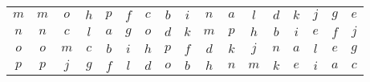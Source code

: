 \documentclass[12pt]{amsart}
\begin{document}
\begin{center}
\begin{tabular}{c|cccccccccccccccc}
	\(m\)  & \(m\)  & \(o\)  & \(h\)  & \(p\)  & \(f\)  & \(c\)  & \(b\)  & \(i\)  & \(n\)  & \(a\)  & \(l\)  & \(d\)  & \(k\)  & \(j\)  & \(g\)  & \(e\)  \\
	\(n\)  & \(n\)  & \(c\)  & \(l\)  & \(a\)  & \(g\)  & \(o\)  & \(d\)  & \(k\)  & \(m\)  & \(p\)  & \(h\)  & \(b\)  & \(i\)  & \(e\)  & \(f\)  & \(j\)  \\
	\(o\)  & \(o\)  & \(m\)  & \(c\)  & \(b\)  & \(i\)  & \(h\)  & \(p\)  & \(f\)  & \(d\)  & \(k\)  & \(j\)  & \(n\)  & \(a\)  & \(l\)  & \(e\)  & \(g\)  \\
	\(p\)  & \(p\)  & \(j\)  & \(g\)  & \(f\)  & \(l\)  & \(d\)  & \(o\)  & \(b\)  & \(h\)  & \(n\)  & \(m\)  & \(k\)  & \(e\)  & \(i\)  & \(a\)  & \(c\)  
\end{tabular}\end{center}
\end{document}

